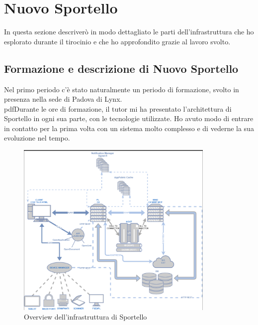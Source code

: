 \section{Nuovo Sportello}

In questa sezione descriverò in modo dettagliato le parti dell'infrastruttura che ho esplorato durante il tirocinio e che ho approfondito grazie al lavoro svolto.

\subsection{Formazione e descrizione di Nuovo Sportello}

Nel primo periodo c'è stato naturalmente un periodo di formazione, svolto in presenza nella sede di Padova di Lynx. \\ 
pdfDurante le ore di formazione, il tutor \NST mi ha presentato l'architettura di Sportello in ogni sua parte, con le tecnologie utilizzate. Ho avuto modo di entrare in contatto per la prima volta con un sistema molto complesso e di vederne la sua evoluzione nel tempo. \\

\begin{figure}[h]
    \centering
	\includegraphics[width=0.85\textwidth]{./res/img/infrastruttura sportello.png}
    \caption{Overview dell'infrastruttura di Sportello}
\end{figure}

